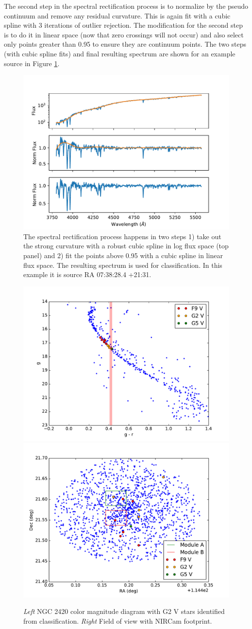 \documentclass{aastex6}
\begin{document}
The second step in the spectral rectification process is to normalize by the pseudo continuum and remove any residual curvature.
This is again fit with a cubic spline with 3 iterations of outlier rejection.
The modification for the second step is to do it in linear space (now that zero crossings will not occur) and also select only points greater than 0.95 to ensure they are continuum points.
The two steps (with cubic spline fits) and final resulting spectrum are shown for an example source in Figure \ref{fig:SpecRect}.

\begin{figure}[!hbtp]
\centering
\includegraphics[width=.7\columnwidth]{images/O_0738284_p2131_spec.pdf}
\caption{The spectral rectification process happens in two steps 1) take out the strong curvature with a robust cubic spline in log flux space (top panel) and 2) fit the points above 0.95 with a cubic spline in linear flux space.
The resulting spectrum is used for classification.
In this example it is source RA 07:38:28.4 +21:31.}\label{fig:SpecRect}
\end{figure}

\begin{figure}[!hbtp]
\centering
\includegraphics[width=.49\columnwidth]{colormag.pdf}
\includegraphics[width=.49\columnwidth]{fov_ngc2420_spTypes.pdf}
\caption{{\it Left} NGC 2420 color magnitude diagram with G2 V stars identified from classification. {\it Right} Field of view with NIRCam footprint.}\label{fig:NCFOV}
\end{figure}
\end{document}
